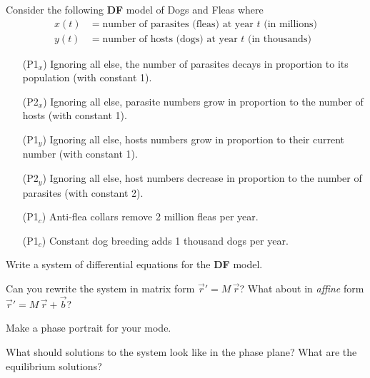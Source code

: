 \documentclass{workbook}
\begin{document}
\begin{slide}
	\question
	Consider the following \textbf{DF} model of Dogs and Fleas where 
	\begin{align*}
		x(t) &= \text{number of parasites (fleas) at year $t$ (in millions)}\\
		y(t) &= \text{number of hosts (dogs) at year $t$ (in thousands)}
	\end{align*}
	\begin{itemize}
		\item[(P1$_x$)] Ignoring all else, the number of parasites decays in proportion to its population (with constant 1).
		\item[(P2$_x$)] Ignoring all else, parasite numbers grow in proportion to the number of hosts (with constant 1).
		\item[(P1$_y$)] Ignoring all else, hosts numbers grow in proportion to their current number (with constant 1).
		\item[(P2$_y$)] Ignoring all else, host numbers decrease in proportion to the number of parasites (with constant 2).
		\item[(P1$_c$)] Anti-flea collars remove 2 million fleas per year.
		\item[(P1$_c$)] Constant dog breeding adds 1 thousand dogs per year.
	\end{itemize}

	\bigskip
	\begin{parts}
		\item Write a system of differential equations for the \textbf{DF} model.
		\item Can you rewrite the system in matrix form $\vec r' = M\,\vec r$? What about in \emph{affine}
		form $\vec r' = M\,\vec r + \vec b$?
		\item Make a phase portrait for your mode.
		\item What should solutions to the system look like in the phase plane? What are the equilibrium solutions?
	\end{parts}
\end{slide}
\end{document}
